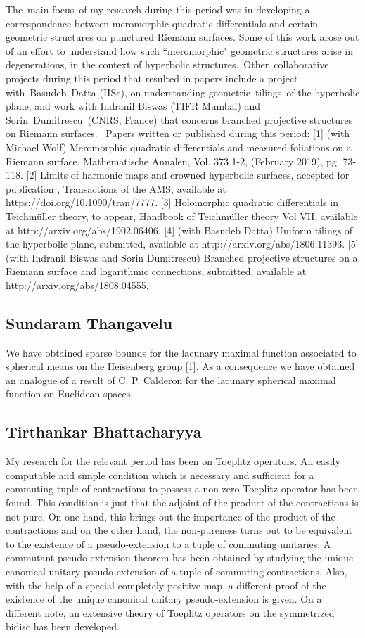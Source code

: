 The main focus of my research during this period was in developing a correspondence between meromorphic quadratic differentials and certain geometric structures on punctured Riemann surfaces. Some of this work arose out of an effort to understand how such ``meromorphic" geometric structures arise in degenerations, in the context of hyperbolic structures. Other collaborative projects during this period that resulted in papers include a project with Basudeb Datta (IISc), on understanding geometric tilings of the hyperbolic plane, and work with Indranil Biswas (TIFR Mumbai) and Sorin Dumitrescu (CNRS, France) that concerns branched projective structures on Riemann surfaces.   Papers written or published during this period:  [1]   (with Michael Wolf)  Meromorphic quadratic differentials and measured foliations on a Riemann surface, Mathematische Annalen, Vol. 373 1-2,  (February 2019), pg. 73-118.  [2]  Limits of harmonic maps and crowned hyperbolic surfaces, accepted for publication , Transactions of the AMS,  available at  https://doi.org/10.1090/tran/7777.   [3]  Holomorphic quadratic differentials in Teichmüller theory,  to appear, Handbook of Teichmüller theory Vol VII, available at  http://arxiv.org/abs/1902.06406.  [4] (with Basudeb Datta)  Uniform tilings of the hyperbolic plane,  submitted, available at http://arxiv.org/abs/1806.11393.  [5] (with Indranil Biswas and Sorin Dumitrescu) Branched projective structures on a Riemann surface and logarithmic connections, submitted, available at http://arxiv.org/abs/1808.04555.  


\subsection{Sundaram Thangavelu}

We have obtained sparse bounds for the lacunary maximal function associated to spherical means on the Heisenberg group [1]. As a consequence we have obtained an analogue of a result of C. P. Calderon for the lacunary spherical maximal function on Euclidean spaces.


\subsection{Tirthankar Bhattacharyya}

My research for the relevant period has been on Toeplitz operators.  An easily computable and simple condition which is necessary and sufficient for a commuting tuple of contractions to possess a non-zero Toeplitz operator has been found.  This condition is just that the adjoint of the product of the contractions is not pure. On one hand, this brings out the importance of the product of the contractions and on the other hand, the non-pureness turns out to be equivalent to the existence of a pseudo-extension to a tuple of commuting unitaries. A commutant pseudo-extension theorem has been obtained by studying the unique canonical unitary pseudo-extension of a tuple of commuting contractions. Also, with the help of a special completely positive map, a different proof of the existence of the unique canonical unitary pseudo-extension is given. On a different note, an extensive theory of Toeplitz operators on the symmetrized bidisc has been developed. 


